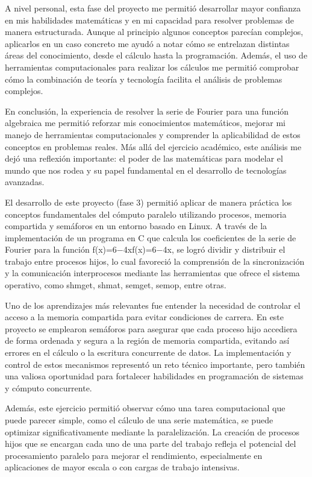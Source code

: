 {A nivel personal, esta fase del proyecto me permitió desarrollar mayor confianza en mis habilidades matemáticas y en mi capacidad para resolver problemas de manera estructurada. Aunque al principio algunos conceptos parecían complejos, aplicarlos en un caso concreto me ayudó a notar cómo se entrelazan distintas áreas del conocimiento, desde el cálculo hasta la programación. Además, el uso de herramientas computacionales para realizar los cálculos me permitió comprobar cómo la combinación de teoría y tecnología facilita el análisis de problemas complejos.

En conclusión, la experiencia de resolver la serie de Fourier para una función algebraica me permitió reforzar mis conocimientos matemáticos, mejorar mi manejo de herramientas computacionales y comprender la aplicabilidad de estos conceptos en problemas reales. Más allá del ejercicio académico, este análisis me dejó una reflexión importante: el poder de las matemáticas para modelar el mundo que nos rodea y su papel fundamental en el desarrollo de tecnologías avanzadas.

\newpage
El desarrollo de este proyecto (fase 3) permitió aplicar de manera práctica los conceptos fundamentales del cómputo paralelo utilizando procesos, memoria compartida y semáforos en un entorno basado en Linux. A través de la implementación de un programa en C que calcula los coeficientes de la serie de Fourier para la función f(x)=6−4xf(x)=6−4x, se logró dividir y distribuir el trabajo entre procesos hijos, lo cual favoreció la comprensión de la sincronización y la comunicación interprocesos mediante las herramientas que ofrece el sistema operativo, como shmget, shmat, semget, semop, entre otras.

Uno de los aprendizajes más relevantes fue entender la necesidad de controlar el acceso a la memoria compartida para evitar condiciones de carrera. En este proyecto se emplearon semáforos para asegurar que cada proceso hijo accediera de forma ordenada y segura a la región de memoria compartida, evitando así errores en el cálculo o la escritura concurrente de datos. La implementación y control de estos mecanismos representó un reto técnico importante, pero también una valiosa oportunidad para fortalecer habilidades en programación de sistemas y cómputo concurrente.

Además, este ejercicio permitió observar cómo una tarea computacional que puede parecer simple, como el cálculo de una serie matemática, se puede optimizar significativamente mediante la paralelización. La creación de procesos hijos que se encargan cada uno de una parte del trabajo refleja el potencial del procesamiento paralelo para mejorar el rendimiento, especialmente en aplicaciones de mayor escala o con cargas de trabajo intensivas.

}
